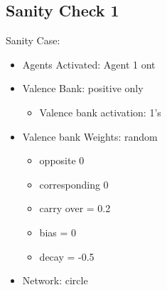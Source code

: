\documentclass{article}\usepackage[]{graphicx}\usepackage[]{color}
\begin{document}
\subsection{Sanity Check 1}
\label{sec:sanity1}
Sanity Case:
\begin{itemize}
  \item Agents Activated: Agent 1 ont
  \item Valence Bank: positive only
  \begin{itemize}
      \item Valence bank activation: 1's
  \end{itemize}
  \item Valence bank Weights: random
  \begin{itemize}
      \item opposite 0
      \item corresponding 0
      \item carry over = 0.2
      \item bias = 0
      \item decay = -0.5
  \end{itemize}
  \item Network: circle
\end{itemize}

%
%

\newpage
\end{document}
